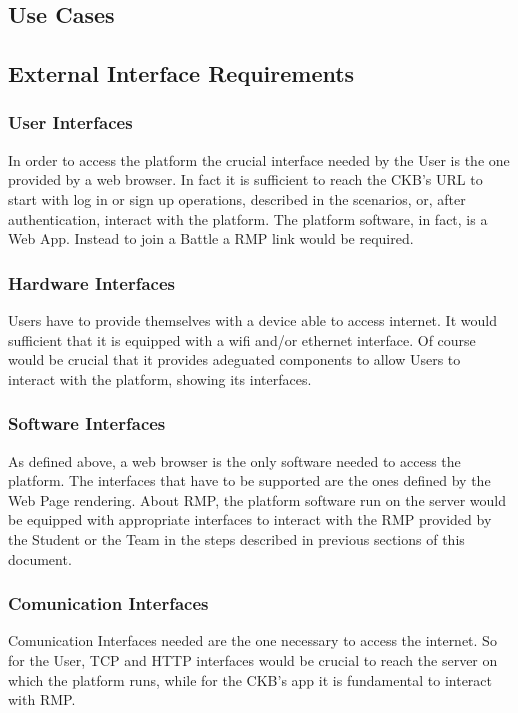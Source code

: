 \subsection{Use Cases}


\subsection{External Interface Requirements}

\subsubsection{User Interfaces}
In order to access the platform the crucial interface needed by the User is the one provided by a web browser. In fact it is sufficient to reach the CKB's URL to start with log in or sign up operations, described in the scenarios, or, after authentication, interact with the platform. The platform software, in fact, is a Web App. Instead to join a Battle a RMP link would be required.
\subsubsection{Hardware Interfaces}
Users have to provide themselves with a device able to access internet. It would sufficient that it is equipped with a wifi and/or ethernet interface. Of course would be crucial that it provides adeguated components to allow Users to interact with the platform, showing its interfaces.
\subsubsection{Software Interfaces}
As defined above, a web browser is the only software needed to access the platform. The interfaces that have to be supported are the ones defined by the Web Page rendering. About RMP, the platform software run on the server would be equipped with appropriate interfaces to interact with the RMP provided by the Student or the Team in the steps described in previous sections of this document.
\subsubsection{Comunication Interfaces}
Comunication Interfaces needed are the one necessary to access the internet. So for the User, TCP and HTTP interfaces would be crucial to reach the server on which the platform runs, while for the CKB's app it is fundamental to interact with RMP.


